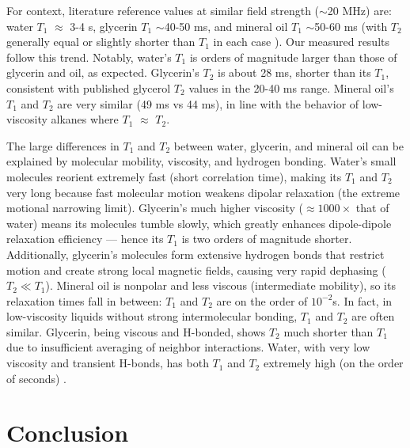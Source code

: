 \documentclass[
    floatfix,  %
    reprint,
    amsmath,
    amssymb,
    aps,
]{revtex4-2}
\begin{document}
For context, literature reference values at similar field strength ($\sim$20 MHz) are:
water $T_1$ $\approx$ 3-4 s,
glycerin $T_1$ $\sim$40-50 ms, and
mineral oil $T_1$ $\sim$50-60 ms \cite{melissinos2003}
(with $T_2$ generally equal or slightly shorter than $T_1$ in each case \cite{abragam1961}).
Our measured results follow this trend. Notably, water's $T_1$ is orders of magnitude larger than those of glycerin and oil, as expected. Glycerin's $T_2$ is about 28 ms, shorter than its $T_1$, consistent with published glycerol $T_2$ values in the 20-40 ms range. Mineral oil's $T_1$ and $T_2$ are very similar (49 ms vs 44 ms), in line with the behavior of low-viscosity alkanes where $T_1$ $\approx$ $T_2$.

The large differences in $T_1$ and $T_2$ between water, glycerin, and mineral oil can be explained by molecular mobility, viscosity, and hydrogen bonding. Water's small molecules reorient extremely fast (short correlation time), making its $T_1$ and $T_2$ very long because fast molecular motion weakens dipolar relaxation (the extreme motional narrowing limit). Glycerin's much higher viscosity ($\approx 1000 \times$ that of water) means its molecules tumble slowly, which greatly enhances dipole-dipole relaxation efficiency — hence its $T_1$ is two orders of magnitude shorter. Additionally, glycerin's molecules form extensive hydrogen bonds that restrict motion and create strong local magnetic fields, causing very rapid dephasing ($T_2 \ll T_1$). Mineral oil is nonpolar and less viscous (intermediate mobility), so its relaxation times fall in between: $T_1$ and $T_2$ are on the order of $10^{-2}$s. In fact, in low-viscosity liquids without strong intermolecular bonding, $T_1$ and $T_2$ are often similar. Glycerin, being viscous and H-bonded, shows $T_2$ much shorter than $T_1$ due to insufficient averaging of neighbor interactions. Water, with very low viscosity and transient H-bonds, has both $T_1$ and $T_2$ extremely high (on the order of seconds) \cite{abragam1961,melissinos2003}.











\section{Conclusion}
\end{document}
